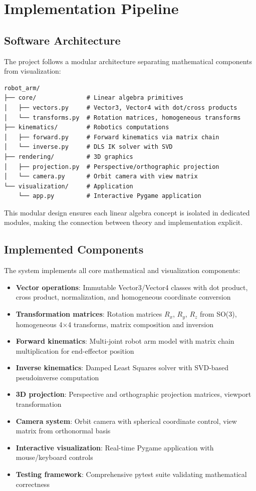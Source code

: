 \documentclass[11pt]{article}
\begin{document}
\section{Implementation Pipeline}

\subsection{Software Architecture}

The project follows a modular architecture separating mathematical components from visualization:

\begin{verbatim}
robot_arm/
├── core/              # Linear algebra primitives
│   ├── vectors.py     # Vector3, Vector4 with dot/cross products
│   └── transforms.py  # Rotation matrices, homogeneous transforms
├── kinematics/        # Robotics computations
│   ├── forward.py     # Forward kinematics via matrix chain
│   └── inverse.py     # DLS IK solver with SVD
├── rendering/         # 3D graphics
│   ├── projection.py  # Perspective/orthographic projection
│   └── camera.py      # Orbit camera with view matrix
└── visualization/     # Application
    └── app.py         # Interactive Pygame application
\end{verbatim}

This modular design ensures each linear algebra concept is isolated in dedicated modules, making the connection between theory and implementation explicit.

\subsection{Implemented Components}

The system implements all core mathematical and visualization components:

\begin{itemize}[nosep]
    \item \textbf{Vector operations}: Immutable Vector3/Vector4 classes with dot product, cross product, normalization, and homogeneous coordinate conversion
    \item \textbf{Transformation matrices}: Rotation matrices $R_x$, $R_y$, $R_z$ from SO(3), homogeneous 4×4 transforms, matrix composition and inversion
    \item \textbf{Forward kinematics}: Multi-joint robot arm model with matrix chain multiplication for end-effector position
    \item \textbf{Inverse kinematics}: Damped Least Squares solver with SVD-based pseudoinverse computation
    \item \textbf{3D projection}: Perspective and orthographic projection matrices, viewport transformation
    \item \textbf{Camera system}: Orbit camera with spherical coordinate control, view matrix from orthonormal basis
    \item \textbf{Interactive visualization}: Real-time Pygame application with mouse/keyboard controls
    \item \textbf{Testing framework}: Comprehensive pytest suite validating mathematical correctness
\end{itemize}
\end{document}
